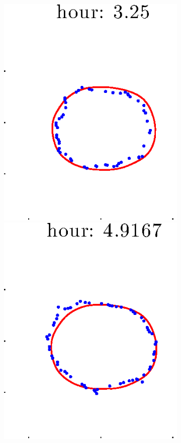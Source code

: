 \documentclass[12pt]{article}
\begin{document}
\begin{figure}[h!]
\begin{subfigure}[b]{.3\textwidth}
		\includegraphics[height=.15\textheight]{Pos10exp2/full/second3.eps}
		\includegraphics[height=.15\textheight]{Pos10exp2/full/second4.eps}

\end{subfigure}
\end{figure}
\end{document}
